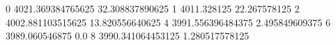 0 4021.369384765625 32.308837890625
1 4011.328125 22.267578125
2 4002.881103515625 13.820556640625
4 3991.556396484375 2.495849609375
6 3989.060546875 0.0
8 3990.341064453125 1.280517578125
